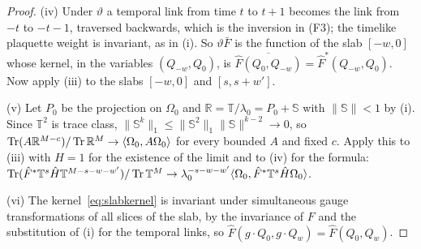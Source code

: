 \begin{proof}
(iv) Under $\vartheta$ a temporal link from time $t$ to $t+1$ becomes the
link from $-t$ to $-t-1$, traversed backwards, which is the inversion in
(F3); the timelike plaquette weight is invariant, as in (i). So
$\vartheta\bar F$ is the function of the slab $[-w,0]$ whose kernel, in the
variables $(Q_{-w},Q_0)$, is $\overline{\hat F(Q_0,Q_{-w})}=\hat F^*(Q_{-w},Q_0)$.
Now apply (iii) to the slabs $[-w,0]$ and $[s,s+w']$.

(v) Let $P_0$ be the projection on $\Omega_0$ and $\mathbb R=\mathbb T/\lambda_0=
P_0+\mathbb S$ with $\|\mathbb S\|<1$ by (i). Since $\mathbb T^2$ is trace
class, $\|\mathbb S^{k}\|_1\le\|\mathbb S^2\|_1\|\mathbb S\|^{k-2}\to0$, so
$\operatorname{Tr}(A\mathbb R^{M-c})/\operatorname{Tr}\mathbb R^M\to\langle \Omega_0,A\Omega_0\rangle$ for every
bounded $A$ and fixed $c$. Apply this to (iii) with $H=1$ for the existence of
the limit and to (iv) for the formula: $\operatorname{Tr}(\hat F^*\mathbb T^s\hat H
\mathbb T^{M-s-w-w'})/\operatorname{Tr}\mathbb T^M\to\lambda_0^{-s-w-w'}\langle \Omega_0,\hat F^*\mathbb T^s\hat H\Omega_0\rangle$.

(vi) The kernel~\eqref{eq:slabkernel} is invariant under simultaneous gauge
transformations of all slices of the slab, by the invariance of $F$ and the
substitution of (i) for the temporal links, so $\hat F(g\cdot Q_0,g\cdot Q_w)=
\hat F(Q_0,Q_w)$.


\end{proof}
